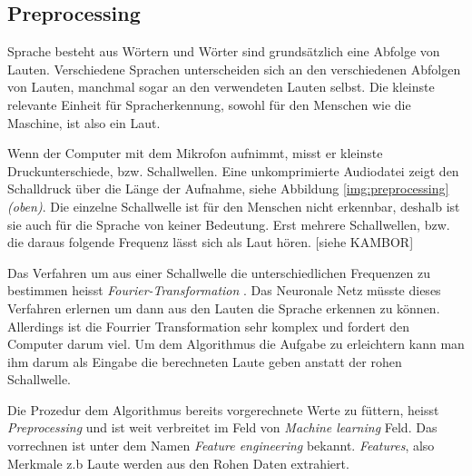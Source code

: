 \subsection{Preprocessing}
Sprache besteht aus Wörtern und Wörter sind grundsätzlich eine Abfolge von Lauten. Verschiedene Sprachen unterscheiden sich an den verschiedenen Abfolgen von Lauten, manchmal sogar an den verwendeten Lauten selbst. Die kleinste relevante Einheit für Spracherkennung, sowohl für den Menschen wie die Maschine, ist also ein Laut.

Wenn der Computer mit dem Mikrofon aufnimmt, misst er kleinste Druckunterschiede, bzw. Schallwellen. Eine unkomprimierte Audiodatei zeigt den Schalldruck über die Länge der Aufnahme, siehe Abbildung \ref{img:preprocessing} \textit{(oben)}.
Die einzelne Schallwelle ist für den Menschen nicht erkennbar, deshalb ist sie auch für die Sprache von keiner Bedeutung. Erst mehrere Schallwellen, bzw. die daraus folgende Frequenz lässt sich als Laut hören. [siehe KAMBOR]

Das Verfahren um aus einer Schallwelle die unterschiedlichen Frequenzen zu bestimmen heisst \textit{Fourier-Transformation} \cite{fourrier}. Das Neuronale Netz müsste dieses Verfahren erlernen um dann aus den Lauten die Sprache erkennen zu können. Allerdings ist die Fourrier Transformation sehr komplex und fordert den Computer darum viel. Um dem Algorithmus die Aufgabe zu erleichtern kann man ihm darum als Eingabe die berechneten Laute geben anstatt der rohen Schallwelle.

Die Prozedur dem Algorithmus bereits vorgerechnete Werte zu füttern, heisst \textit{Preprocessing} und ist weit verbreitet im Feld von \textit{Machine learning} Feld. Das vorrechnen ist unter dem Namen \textit{Feature engineering} bekannt. \textit{Features}, also Merkmale z.b Laute werden aus den Rohen Daten extrahiert. \parencite[vgl.][]{chollet}

